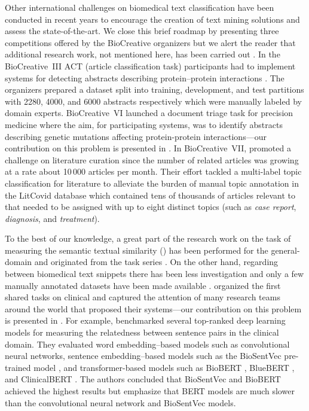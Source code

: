 Other international challenges on biomedical text classification have been conducted in recent years to encourage the creation of text mining solutions and assess the state-of-the-art.
We close this brief roadmap by presenting three competitions offered by the BioCreative organizers but we alert the reader that additional research work, not mentioned here, has been carried out \parencite{huang2016a}.
In the BioCreative~III  ACT (article classification task) participants had to implement systems for detecting  abstracts describing protein--protein interactions \parencite{krallinger2010a,krallinger2011a}.
The organizers prepared a dataset split into training, development, and test partitions with 2280, 4000, and 6000 abstracts respectively which were manually labeled by domain experts.
BioCreative~VI launched a document triage task for precision medicine where the aim, for participating systems, was to identify  abstracts describing genetic mutations affecting protein-protein interactions---our contribution on this problem is presented in .
In BioCreative~VII, \textcite{chen2021b,chen2022c} promoted a challenge on  literature curation since the number of  related articles was growing at a rate about 10\,000 articles per month.
Their effort tackled a multi-label topic classification for  literature to alleviate the burden of manual topic annotation in the LitCovid database \parencite{chen2021c} which contained tens of thousands of  articles relevant to  that needed to be assigned with up to eight distinct topics (such as \textit{case report}, \textit{diagnosis}, and \textit{treatment}).

To the best of our knowledge, a great part of the research work on the task of measuring the semantic textual similarity () has been performed for the general-domain and originated from the   task series \parencite{agirre2012a,agirre2013a,agirre2014b,agirre2015a,agirre2016a}.
On the other hand, regarding  between biomedical text snippets there has been less investigation and only a few manually annotated datasets have been made available \parencite{sogancioglu2017a,wang2018d,wang2020d}.
\textcite{wang2018e,wang2020d} organized the first shared tasks on clinical 
and captured the attention of many research teams around the world that proposed their systems---our contribution on this problem is presented in .
For example, \textcite{chen2021a} benchmarked several top-ranked deep learning models for measuring the relatedness between sentence pairs in the clinical domain.
They evaluated word embedding--based models such as convolutional neural networks, sentence embedding--based models such as the BioSentVec pre-trained model \parencite{chen2019g}, and transformer-based models such as BioBERT \parencite{lee2020a}, BlueBERT \parencite{peng2019a}, and ClinicalBERT \parencite{alsentzer2019a}.
The authors concluded that BioSentVec and BioBERT achieved the highest results but emphasize that BERT models are much slower than the convolutional neural network and BioSentVec models.

